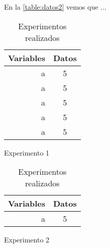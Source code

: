 \documentclass[12pt]{report}
\begin{document}
		En la \cref{table:datos2} vemos que ... \lipsum[1] \cite{cabrera_morales_efectos_2006}
		\begin{table}[h!]
			\centering
			\begin{subtable}{0.4\textwidth}
				\centering
				\begin{tabular}{| r | c |}
					\hline
					Variables  & Datos \\ \hline
					a & 5 \\ \hline
					a & 5 \\ \hline
					a & 5 \\ \hline
					a & 5 \\ \hline
					a & 5 \\ \hline
				\end{tabular}
				\caption{Experimento 1}
				\label{table:datos1}
			\end{subtable}
			\hfill
			\begin{subtable}{0.4\textwidth}
				\centering
				\begin{tabular}{| r | c |}
					\hline
					Variables  & Datos \\ \hline
					a & 5 \\ \hline
				\end{tabular}
				\caption{Experimento 2}
				\label{table:datos2}
			\end{subtable}
			\caption{Experimentos realizados}
			\label{table:datos}
		\end{table}
		\lipsum[1-3]
		
\end{document}
